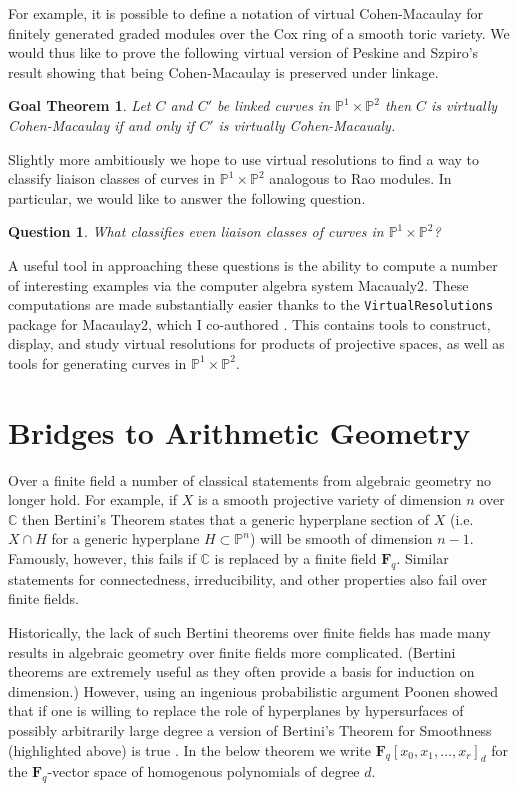 \documentclass[10pt,reqno]{amsart}
\newtheorem{goalTheorem}[lemma]{Goal Theorem}
\newtheorem{question}[lemma]{Question}
\theoremstyle{remark}
\newcommand{\fF}{\mathbf F}
\newcommand{\C}{\mathbb{C}}
\renewcommand{\P}{\mathbb{P}}
\begin{document}
For example, it is possible to define a notation of virtual Cohen-Macaulay for finitely generated graded modules over the Cox ring of a smooth toric variety. We would thus like to prove the following virtual version of Peskine and Szpiro's result showing that being Cohen-Macaulay is preserved under linkage. 

\begin{goalTheorem}
Let $C$ and $C'$ be linked curves in $\P^1\times\P^2$ then $C$ is virtually Cohen-Macaulay if and only if $C'$ is virtually Cohen-Macaualy.
\end{goalTheorem}

Slightly more ambitiously we hope to use virtual resolutions to find a way to classify liaison classes of curves in $\P^1\times\P^2$ analogous to Rao modules. In particular, we would like to answer the following question. 
 
\begin{question}
What classifies even liaison classes of curves in $\P^1\times\P^2$?
\end{question}

A useful tool in approaching these questions is the ability to compute a number of interesting examples via the computer algebra system Macaualy2. These computations are made substantially easier thanks to the  \texttt{VirtualResolutions} package for Macaulay2, which I co-authored \cite{almousaBruce19}. This contains tools to construct, display, and study virtual resolutions for products of projective spaces, as well as tools for generating curves in $\P^1\times\P^2$. 

\section{Bridges to Arithmetic Geometry}

Over a finite field a number of classical statements from algebraic geometry no longer hold. For example, if $X$ is a smooth projective variety of dimension $n$ over $\C$ then Bertini's Theorem states that a generic hyperplane section of $X$ (i.e. $X\cap H$ for a generic hyperplane $H\subset \P^n$) will be smooth of dimension $n-1$. Famously, however, this fails if $\C$ is replaced by a finite field $\fF_{q}$. Similar statements for connectedness, irreducibility, and other properties also fail over finite fields. 

Historically, the lack of such Bertini theorems over finite fields has made many results in algebraic geometry over finite fields more complicated. (Bertini theorems are extremely useful as they often provide a basis for induction on dimension.) However, using an ingenious probabilistic argument Poonen showed that if one is willing to replace the role of hyperplanes by hypersurfaces of possibly arbitrarily large degree a version of Bertini's Theorem for Smoothness (highlighted above) is true \cite{poonen04}. In the below theorem we write $\fF_{q}[x_{0},x_{1},\ldots,x_{r}]_{d}$ for the $\fF_{q}$-vector space of homogenous polynomials of degree $d$. 
\end{document}
